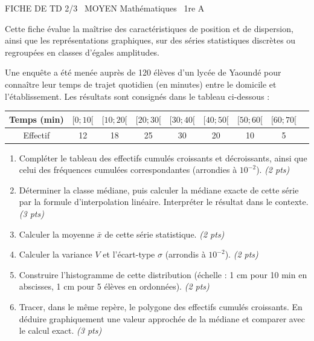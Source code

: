 \documentclass[11pt]{article}
\begin{document}
\begin{tcolorbox}[enhanced,colback=popink,colframe=popink,arc=10pt,boxrule=0pt,left=12pt,right=12pt,top=9pt,bottom=9pt]
{\color{white}\popxbold\small FICHE DE TD 2/3 \textbullet\ MOYEN \hfill Mathématiques \textbullet\ 1re A\par}
\end{tcolorbox}
\vspace{4pt}
\noindent Cette fiche évalue la maîtrise des caractéristiques de position et de dispersion, ainsi que les représentations graphiques, sur des séries statistiques discrètes ou regroupées en classes d'égales amplitudes.

\begin{exercice}
Une enquête a été menée auprès de \num{120} élèves d'un lycée de Yaoundé pour connaître leur temps de trajet quotidien (en minutes) entre le domicile et l'établissement. Les résultats sont consignés dans le tableau ci-dessous :

\begin{center}
\begin{tabular}{|c|c|c|c|c|c|c|c|c|}
\hline
Temps (min) & $[0; 10[$ & $[10; 20[$ & $[20; 30[$ & $[30; 40[$ & $[40; 50[$ & $[50; 60[$ & $[60; 70[$ \\
\hline
Effectif & 12 & 18 & 25 & 30 & 20 & 10 & 5 \\
\hline
\end{tabular}
\end{center}

\begin{enumerate}
    \item Compléter le tableau des effectifs cumulés croissants et décroissants, ainsi que celui des fréquences cumulées correspondantes (arrondies à $10^{-2}$). \textit{(2 pts)}
    \item Déterminer la classe médiane, puis calculer la médiane exacte de cette série par la formule d'interpolation linéaire. Interpréter le résultat dans le contexte. \textit{(3 pts)}
    \item Calculer la moyenne $\bar{x}$ de cette série statistique. \textit{(2 pts)}
    \item Calculer la variance $V$ et l'écart-type $\sigma$ (arrondis à $10^{-2}$). \textit{(2 pts)}
    \item Construire l'histogramme de cette distribution (échelle : 1 cm pour 10 min en abscisses, 1 cm pour 5 élèves en ordonnées). \textit{(2 pts)}
    \item Tracer, dans le même repère, le polygone des effectifs cumulés croissants. En déduire graphiquement une valeur approchée de la médiane et comparer avec le calcul exact. \textit{(3 pts)}
\end{enumerate}
\end{exercice}
\end{document}
